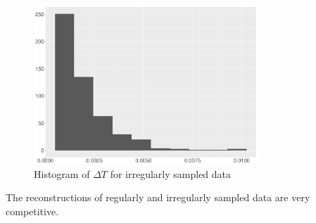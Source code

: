 \begin{figure}[h!]
    \centering
    \includegraphics[width=0.75\textwidth]{Chapters/02TractorSplineTheory/plot/ggplot/gghistIrregularTime.pdf}
 \caption{Histogram of $\Delta T$ for irregularly sampled data}\label{gghistIrregularTime}
 \end{figure}


The reconstructions of regularly and irregularly sampled data are very competitive. 

